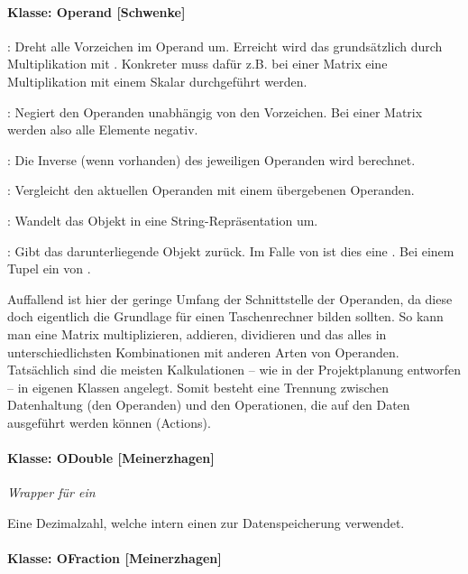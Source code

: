 \paragraph{Klasse: Operand [Schwenke]}

: Dreht alle Vorzeichen im Operand um. Erreicht wird das grundsätzlich durch Multiplikation mit . Konkreter muss dafür z.B. bei einer Matrix eine Multiplikation mit einem Skalar durchgeführt werden.

: Negiert den Operanden unabhängig von den Vorzeichen. Bei einer Matrix werden also alle Elemente negativ.

: Die Inverse (wenn vorhanden) des jeweiligen Operanden wird berechnet.

: Vergleicht den aktuellen Operanden mit einem übergebenen Operanden.

: Wandelt das Objekt in eine String-Repräsentation um.

: Gibt das darunterliegende Objekt zurück. Im Falle von  ist dies eine . Bei einem Tupel ein  von .

Auffallend ist hier der geringe Umfang der Schnittstelle der Operanden, da diese doch eigentlich die Grundlage für einen Taschenrechner bilden sollten. So kann man eine Matrix multiplizieren, addieren, dividieren und das alles in unterschiedlichsten Kombinationen mit anderen Arten von Operanden. Tatsächlich sind die meisten Kalkulationen – wie in der Projektplanung entworfen – in eigenen Klassen angelegt. Somit besteht eine Trennung zwischen Datenhaltung (den Operanden) und den Operationen, die auf den Daten ausgeführt werden können (Actions).

\paragraph{Klasse: ODouble [Meinerzhagen]}

\textit{Wrapper für ein }

Eine Dezimalzahl, welche intern einen  zur Datenspeicherung verwendet.


\paragraph{Klasse: OFraction [Meinerzhagen]}

